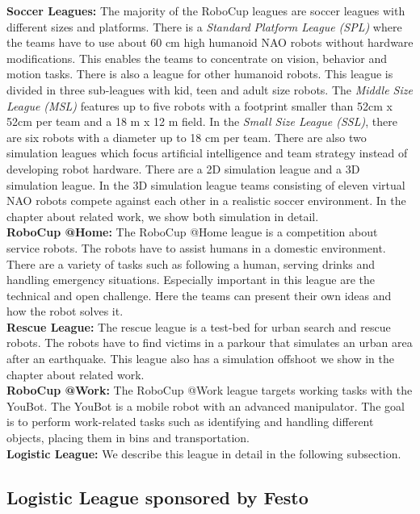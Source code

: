 \textbf{Soccer Leagues:} The majority of the RoboCup leagues are soccer leagues with different sizes and platforms. There is a \textit{Standard Platform League (SPL)} where the teams have to use about 60 cm high humanoid NAO robots without hardware modifications. This enables the teams to concentrate on vision, behavior and motion tasks. There is also a league for other humanoid robots. This league is divided in three sub-leagues with kid, teen and adult size robots. The \textit{Middle Size League (MSL)} features up to five robots with a footprint smaller than 52cm x 52cm per team and a 18 m x 12 m field. In the \textit{Small Size League (SSL)}, there are six robots with a diameter up to 18 cm per team. There are also two simulation leagues which focus artificial intelligence and team strategy instead of developing robot hardware. There are a 2D simulation league and a 3D simulation league. In the 3D simulation league teams consisting of eleven virtual NAO robots compete against each other in a realistic soccer environment. In the chapter about related work, we show both simulation in detail.\\
\textbf{RoboCup @Home:} The RoboCup @Home league is a competition about service robots. The robots have to assist humans in a domestic environment. There are a variety of tasks such as following a human, serving drinks and handling emergency situations. Especially important in this league are the technical and open challenge. Here the teams can present their own ideas and how the robot solves it.\\
\textbf{Rescue League:} The rescue league is a test-bed for urban search and rescue robots. The robots have to find victims in a parkour that simulates an urban area after an earthquake. This league also has a simulation offshoot we show in the chapter about related work.\\
\textbf{RoboCup @Work:} The RoboCup @Work league targets working tasks with the YouBot. The YouBot is a mobile robot with an advanced manipulator. The goal is to perform work-related tasks such as identifying and handling different objects, placing them in bins and transportation.\\
\textbf{Logistic League:} We describe this league in detail in the following subsection.\\

\subsection{Logistic League sponsored by Festo}

